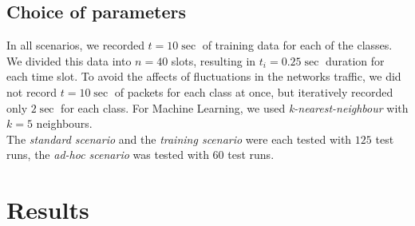 \documentclass[conference]{IEEEtran}
\begin{document}
\subsection{Choice of parameters}
In all scenarios, we recorded $t=10\sec$ of training data for each of the classes. We divided this data into $n=40$ slots, resulting in $t_i=0.25\sec$ duration for each time slot. To avoid the affects of fluctuations in the networks traffic, we did not record $t=10\sec$ of packets for each class at once, but iteratively recorded only $2\sec$ for each class. For Machine Learning, we used \emph{k-nearest-neighbour} with $k=5$ neighbours. \\
The \emph{standard scenario} and the \emph{training scenario} were each tested with $125$ test runs, the \emph{ad-hoc scenario} was tested with $60$ test runs.
%
\section{Results}
\end{document}
